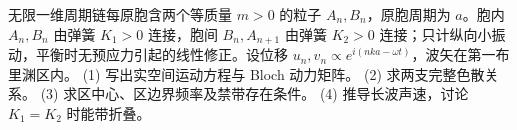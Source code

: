 无限一维周期链每原胞含两个等质量 \(m>0\) 的粒子 \(A_n,B_n\)，原胞周期为 \(a\)。胞内 \(A_n,B_n\) 由弹簧 \(K_1>0\) 连接，胞间 \(B_n,A_{n+1}\) 由弹簧 \(K_2>0\) 连接；只计纵向小振动，平衡时无预应力引起的线性修正。设位移 \(u_n,v_n\propto e^{i(nka-\omega t)}\)，波矢在第一布里渊区内。
(1) 写出实空间运动方程与 Bloch 动力矩阵。
(2) 求两支完整色散关系。
(3) 求区中心、区边界频率及禁带存在条件。
(4) 推导长波声速，讨论 \(K_1=K_2\) 时能带折叠。
